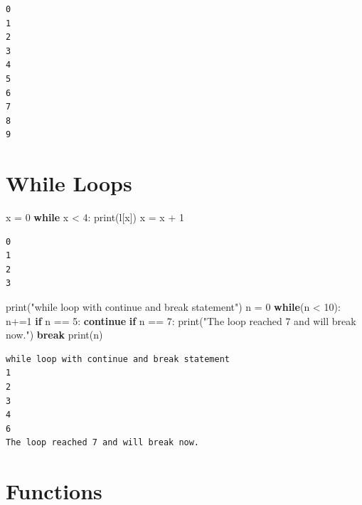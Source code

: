 \documentclass[
  letterpaper,
  DIV=11,
  numbers=noendperiod]{scrreprt}
\newenvironment{Shaded}{\begin{snugshade}}{\end{snugshade}}
\newcommand{\BuiltInTok}[1]{\textcolor[rgb]{0.00,0.23,0.31}{#1}}
\newcommand{\ControlFlowTok}[1]{\textcolor[rgb]{0.00,0.23,0.31}{\textbf{#1}}}
\newcommand{\DecValTok}[1]{\textcolor[rgb]{0.68,0.00,0.00}{#1}}
\newcommand{\NormalTok}[1]{\textcolor[rgb]{0.00,0.23,0.31}{#1}}
\newcommand{\OperatorTok}[1]{\textcolor[rgb]{0.37,0.37,0.37}{#1}}
\newcommand{\StringTok}[1]{\textcolor[rgb]{0.13,0.47,0.30}{#1}}
\begin{document}
\begin{verbatim}
0
1
2
3
4
5
6
7
8
9
\end{verbatim}

\section*{While Loops}\label{while-loops}


\begin{Shaded}
\begin{Highlighting}[]
\NormalTok{x }\OperatorTok{=} \DecValTok{0}
\ControlFlowTok{while}\NormalTok{ x  }\OperatorTok{\textless{}} \DecValTok{4}\NormalTok{:}
    \BuiltInTok{print}\NormalTok{(l[x])}
\NormalTok{    x }\OperatorTok{=}\NormalTok{ x }\OperatorTok{+} \DecValTok{1}
\end{Highlighting}
\end{Shaded}

\begin{verbatim}
0
1
2
3
\end{verbatim}

\begin{Shaded}
\begin{Highlighting}[]
\BuiltInTok{print}\NormalTok{(}\StringTok{"while loop with continue and break statement"}\NormalTok{)}
\NormalTok{n }\OperatorTok{=} \DecValTok{0}
\ControlFlowTok{while}\NormalTok{(n }\OperatorTok{\textless{}} \DecValTok{10}\NormalTok{):}
\NormalTok{    n}\OperatorTok{+=}\DecValTok{1}
    \ControlFlowTok{if}\NormalTok{ n }\OperatorTok{==} \DecValTok{5}\NormalTok{:}
        \ControlFlowTok{continue}
    \ControlFlowTok{if}\NormalTok{ n }\OperatorTok{==} \DecValTok{7}\NormalTok{:}
        \BuiltInTok{print}\NormalTok{(}\StringTok{"The loop reached 7 and will break now."}\NormalTok{)}
        \ControlFlowTok{break}
    \BuiltInTok{print}\NormalTok{(n)}
\end{Highlighting}
\end{Shaded}

\begin{verbatim}
while loop with continue and break statement
1
2
3
4
6
The loop reached 7 and will break now.
\end{verbatim}

\section*{Functions}\label{functions}
\end{document}

